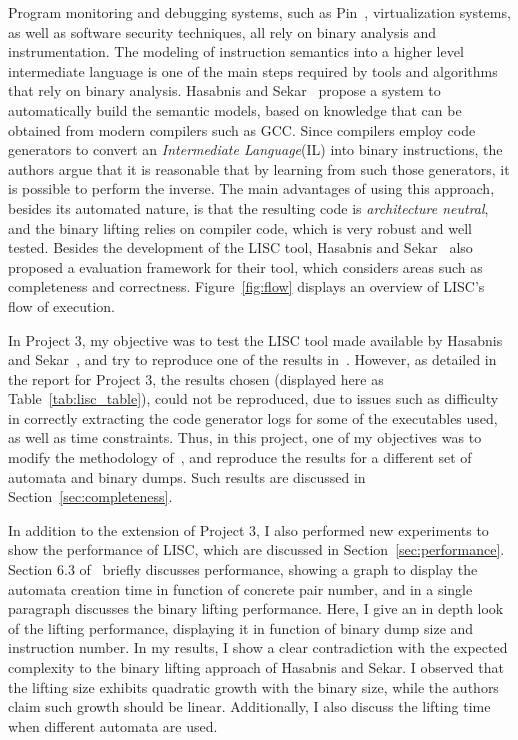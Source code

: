 \documentclass[12pt]{article}
\begin{document}
Program monitoring and debugging systems, such as Pin~\cite{Pin}, virtualization systems, as well as software security techniques, all rely on binary analysis and instrumentation. The modeling of instruction semantics into a higher level intermediate language is one of the main steps required by tools and algorithms that rely on binary analysis. 
%
%
Hasabnis and Sekar~\cite{Hasabnis2014} propose a system to automatically build the semantic models, based on knowledge that can be obtained from modern compilers such as GCC. Since compilers employ code generators to convert an \textit{Intermediate Language}(IL) into binary instructions, the authors argue that it is reasonable that by learning from such those generators, it is possible to perform the inverse. The main advantages of using this approach, besides its automated nature, is that the resulting code is \textit{architecture neutral}, and the binary lifting relies on compiler code, which is very robust and well tested. Besides the development of the LISC tool, Hasabnis and Sekar~\cite{Hasabnis2014} also proposed a evaluation framework for their tool, which considers areas such as completeness and correctness. Figure~\ref{fig:flow} displays an overview of LISC's flow of execution.

In Project 3, my objective was to test the LISC tool made available by Hasabnis and Sekar~\cite{LISC}, and try to reproduce one of the results in~\cite{Hasabnis2014}. However, as detailed in the report for Project 3, the results chosen (displayed here as Table~\ref{tab:lisc_table}), could not be reproduced, due to issues such as difficulty in correctly extracting the code generator logs for some of the executables used, as well as time constraints. Thus, in this project, one of my objectives was to modify the methodology of~\cite{Hasabnis2014}, and reproduce the results for a different set of automata and binary dumps. Such results are discussed in Section~\ref{sec:completeness}.

In addition to the extension of Project 3, I also performed new experiments to show the performance of LISC, which are discussed in Section~\ref{sec:performance}. Section 6.3 of~\cite{Hasabnis2014} briefly discusses performance, showing a graph to display the automata creation time in function of concrete pair number, and in a single paragraph discusses the binary lifting performance. Here, I give an in depth look of the lifting performance, displaying it in function of binary dump size and instruction number. In my results, I show a clear contradiction with the expected complexity to the binary lifting approach of Hasabnis and Sekar. I observed that the lifting size exhibits quadratic growth with the binary size, while the authors claim such growth should be linear. Additionally, I also discuss the lifting time when different automata are used.
\end{document}
